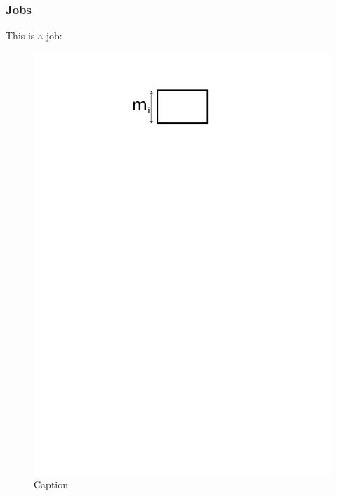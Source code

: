 \documentclass{beamer}
\begin{document}
\begin{frame}
  \frametitle{Jobs}

  This is a job:
  \begin{figure}[H]
          \centerin
          \includegraphics[width=\textwidth]{job.png}
          \caption{Caption}
          \label{fig:job_jpg}
  \end{figure}

\end{frame}
\label{sub:jobs}
\end{document}
